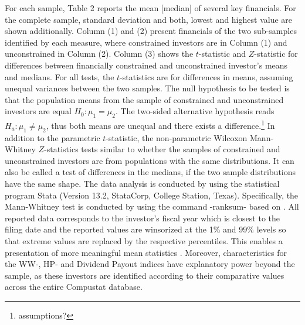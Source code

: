 \documentclass[12pt]{article}
\begin{document}
For each sample, Table 2 reports the mean [median] of several key financials. For the complete sample, standard deviation and both, lowest and highest value are shown additionally. Column (1) and (2) present financials of the two sub-samples identified by each measure, where constrained investors are in Column (1) and unconstrained in Column (2). Column (3) shows the $t$-statistic and $Z$-statistic for differences between financially constrained and unconstrained investor's means and medians. For all tests, the $t$-statistics are for differences in means, assuming unequal variances between the two samples. The null hypothesis to be tested is that the population means from the sample of constrained and unconstrained investors are equal $H_{0}: \mu_{1}=\mu_{2}$. The two-sided alternative hypothesis reads $H_{a}: \mu_{1}\neq\mu_{2}$, thus both means are unequal and there exists a difference.\footnote{assumptions?} In addition to the parametric $t$-statistic, the non-parametric Wilcoxon Mann-Whitney $Z$-statistics tests similar to \citet[p.201]{Klein2009} whether the samples of constrained and unconstrained investors are from populations with the same distributions. It can also be called a test of differences in the medians, if the two sample distributions have the same shape. The data analysis is conducted by using the statistical program Stata (Version 13.2, StataCorp, College Station, Texas). Specifically, the Mann-Whitney test is conducted by using the command -ranksum- based on \citet[p.59]{Mann1947}. All reported data corresponds to the investor's fiscal year which is closest to the filing date and the reported values are winsorized at the 1\% and 99\% levels so that extreme values are replaced by the respective percentiles. This enables a presentation of more meaningful mean statistics \citep[p.203]{Klein2009}. Moreover, characteristics for the WW-, HP- and Dividend Payout indices have explanatory power beyond the sample, as these investors are identified according to their comparative values across the entire Compustat database. 
\end{document}
